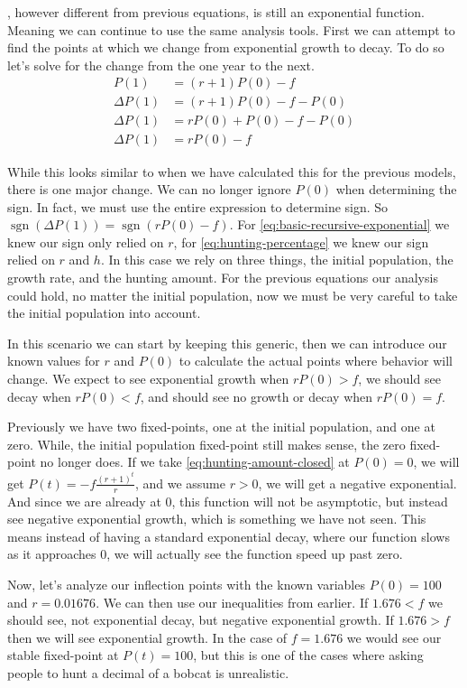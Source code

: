 \documentclass{article}
\DeclareMathOperator{\sgn}{sgn}
\begin{document}
, however different from previous equations, is still an exponential function. Meaning we can continue to use the same analysis tools. First we can attempt to find the points at which we change from exponential growth to decay. To do so let's solve for the change from the one year to the next.
\begin{align*}
    P(1) &= (r + 1)P(0)-f \\
    \Delta P(1) &= (r + 1)P(0) - f - P(0) \\
    \Delta P(1) &= rP(0)+P(0)-f-P(0) \\
    \Delta P(1) &= rP(0) - f
\end{align*}

While this looks similar to when we have calculated this for the previous models, there is one major change. We can no longer ignore $P(0)$ when determining the sign. In fact, we must use the entire expression to determine sign. So $\sgn(\Delta P(1)) = \sgn(rP(0)-f)$. For \cref{eq:basic-recursive-exponential} we knew our sign only relied on $r$, for \cref{eq:hunting-percentage} we knew our sign relied on $r$ and $h$. In this case we rely on three things, the initial population, the growth rate, and the hunting amount. For the previous equations our analysis could hold, no matter the initial population, now we must be very careful to take the initial population into account.

In this scenario we can start by keeping this generic, then we can introduce our known values for $r$ and $P(0)$ to calculate the actual points where behavior will change. We expect to see exponential growth when $rP(0)>f$, we should see decay when $rP(0)<f$, and should see no growth or decay when $rP(0)=f$.

Previously we have two fixed-points, one at the initial population, and one at zero. While, the initial population fixed-point still makes sense, the zero fixed-point no longer does. If we take \cref{eq:hunting-amount-closed} at $P(0)=0$, we will get $P(t) = -f\frac{(r+1)^t}{r}$, and we assume $r > 0$, we will get a negative exponential. And since we are already at 0, this function will not be asymptotic, but instead see negative exponential growth, which is something we have not seen. This means instead of having a standard exponential decay, where our function slows as it approaches 0, we will actually see the function speed up past zero.

Now, let's analyze our inflection points with the known variables $P(0) = 100$ and $r = 0.01676$. We can then use our inequalities from earlier. If $1.676<f$ we should see, not exponential decay, but negative exponential growth. If $1.676>f$ then we will see exponential growth. In the case of $f=1.676$ we would see our stable fixed-point at $P(t)=100$, but this is one of the cases where asking people to hunt a decimal of a bobcat is unrealistic.
\end{document}
